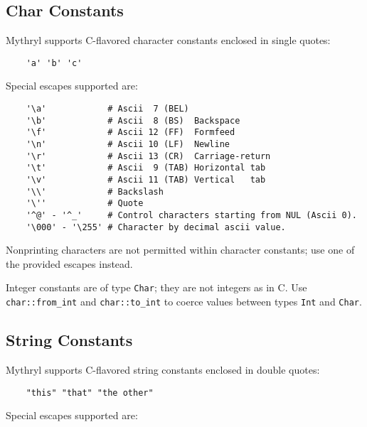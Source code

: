 
\subsection{Char Constants}
\label{section:ref:constants:char}

Mythryl supports C-flavored character constants enclosed in single quotes:

\begin{verbatim}
    'a' 'b' 'c'
\end{verbatim}

Special escapes supported are:

\begin{verbatim}
    '\a'            # Ascii  7 (BEL)
    '\b'            # Ascii  8 (BS)  Backspace
    '\f'            # Ascii 12 (FF)  Formfeed
    '\n'            # Ascii 10 (LF)  Newline
    '\r'            # Ascii 13 (CR)  Carriage-return
    '\t'            # Ascii  9 (TAB) Horizontal tab
    '\v'            # Ascii 11 (TAB) Vertical   tab
    '\\'            # Backslash
    '\''            # Quote
    '^@' - '^_'     # Control characters starting from NUL (Ascii 0).
    '\000' - '\255' # Character by decimal ascii value.
\end{verbatim}

Nonprinting characters are not permitted within character constants; 
use one of the provided escapes instead.

Integer constants are of type {\tt Char}; they are not integers as in C. 
Use {\tt char::from\_int} and {\tt char::to\_int} to coerce values between 
types {\tt Int} and {\tt Char}.

\cutend*

\subsection{String Constants}
\label{section:ref:constants:string}

Mythryl supports C-flavored string constants enclosed in double quotes:

\begin{verbatim}
    "this" "that" "the other"
\end{verbatim}

Special escapes supported are:

